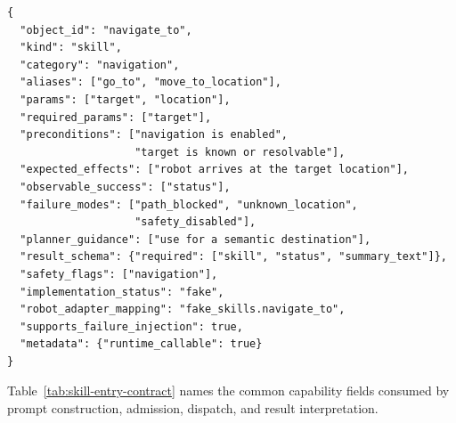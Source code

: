\begin{lstlisting}
{
  "object_id": "navigate_to",
  "kind": "skill",
  "category": "navigation",
  "aliases": ["go_to", "move_to_location"],
  "params": ["target", "location"],
  "required_params": ["target"],
  "preconditions": ["navigation is enabled",
                    "target is known or resolvable"],
  "expected_effects": ["robot arrives at the target location"],
  "observable_success": ["status"],
  "failure_modes": ["path_blocked", "unknown_location",
                    "safety_disabled"],
  "planner_guidance": ["use for a semantic destination"],
  "result_schema": {"required": ["skill", "status", "summary_text"]},
  "safety_flags": ["navigation"],
  "implementation_status": "fake",
  "robot_adapter_mapping": "fake_skills.navigate_to",
  "supports_failure_injection": true,
  "metadata": {"runtime_callable": true}
}
\end{lstlisting}

Table~\ref{tab:skill-entry-contract} names the common capability fields consumed by prompt construction, admission, dispatch, and result interpretation.

